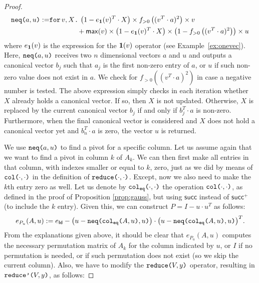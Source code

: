 \begin{proof}
    \begin{align*}\allowdisplaybreaks
       \nneq{a}{u} := &\texttt{for}\, v,X \texttt{.}\, \left( 1-e_{\ones}(v)^T\cdot X \right) \times f_{>0}\left( ( v^T\cdot a )^2 \right)\times v \\
        &\hspace{4em}+ \mathsf{max}(v)\times\left( 1-e_{\ones}(v)^T\cdot X \right)\times \left( 1 - f_{>0}\left( ( v^T\cdot a )^2 \right) \right) \times u \\
    \end{align*}
where $e_{\mathbf{1}}(v)$ is the expression for the $\mathbf{1}(v)$ operator (see Example~\ref{ex:onevec}).
Here, $\texttt{neq(}a,u\texttt{)}$ receives two $n$ dimensional vectors $a$ and $u$ and outputs a 
    canonical vector $b_j$ such that $a_j$ is the first non-zero entry of $a$, or $u$ if such non-zero value does not exist in $a$. We check for $f_{>0}((v^T\cdot a)^2)$ 
    in case a negative number is tested. The above expression simply checks in each iteration
    whether $X$ already holds a canonical vector. If so, then $X$ is not updated. Otherwise,
    $X$ is replaced by the current canonical vector $b_j$ if and only if $b_j^T\cdot a$ is non-zero. Furthermore, when the final canonical vector is considered and $X$ does not hold
    a canonical vector yet and $b_n^T\cdot a$ is zero, the vector $u$ is returned.

    We use $\texttt{neq(}a,u\texttt{)}$ to find a pivot for a specific column. Let us assume again that we
    want to find a pivot in column $k$ of $A_k$. We can then first make all entries in that column, with indexes smaller or equal to $k$, zero, just as we did by means of $\texttt{col(}\cdot,\cdot\texttt{)}$ in the
    definition of $\texttt{reduce(}\cdot,\cdot\texttt{)}$. Except, now we also need to make the $k$th entry zero as well.
    Let us denote by $\texttt{col}_{\texttt{eq}}\texttt{(}\cdot,\cdot\texttt{)}$ the operation $\texttt{col(}\cdot,\cdot\texttt{)}$, as defined in the proof of Proposition \ref{prop:gauss}, but using $\mathsf{succ}$ instead of $\mathsf{succ}^+$ (to include the $k$ entry). Given this, we can construct $P=I-u\cdot u^T$ as follows:
    $$
    e_{P_u}(A,u) := e_{\mathsf{Id}} - \bigl(u - \texttt{neq(} \texttt{col}_{\texttt{eq}}\texttt{(}A,u\texttt{)} ,u\texttt{)} \bigr)\cdot \bigl(u - \texttt{neq(} \texttt{col}_{\texttt{eq}}\texttt{(}A,u\texttt{)} ,u\texttt{)} \bigr)^T.
    $$ 
    From the explanations given above, it should be clear that $e_{P_u}(A,u)$ computes the necessary permutation matrix of $A_k$ for the column indicated by $u$, or $I$
    if no permutation is needed, or if such permutation does not exist (so we skip the current column). Also, we have to modify the $\texttt{reduce(}V,y\texttt{)}$ operator, resulting in $\texttt{reduce'(}V,y\texttt{)}$, as follows:


\end{proof}
